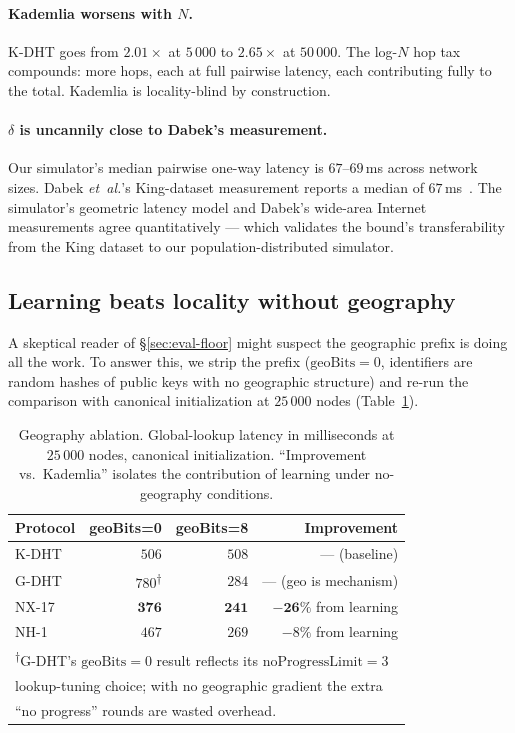 \documentclass[conference]{IEEEtran}
\newcommand{\nhone}{NH-1\xspace}
\newcommand{\GDHT}{G-DHT\xspace}
\newcommand{\NXseventeen}{NX-17\xspace}
\begin{document}
\paragraph{Kademlia worsens with $N$.}
K-DHT goes from $2.01\times$ at $5\,000$ to $2.65\times$ at $50\,000$.
The log-$N$ hop tax compounds: more hops, each at full pairwise
latency, each contributing fully to the total. Kademlia is locality-blind
by construction.

\paragraph{$\delta$ is uncannily close to Dabek's measurement.}
Our simulator's median pairwise one-way latency is $67$--$69$\,ms across
network sizes. Dabek \emph{et~al.}'s King-dataset measurement reports a
median of $67$\,ms~\cite{dabek2004designing}. The simulator's geometric
latency model and Dabek's wide-area Internet measurements agree
quantitatively --- which validates the bound's transferability from
the King dataset to our population-distributed simulator.

\subsection{Learning beats locality without geography}
\label{sec:eval-geo}

A skeptical reader of \S\ref{sec:eval-floor} might suspect the
geographic prefix is doing all the work. To answer this, we strip
the prefix ($\mathrm{geoBits} = 0$, identifiers are random hashes of
public keys with no geographic structure) and re-run the comparison
with canonical initialization at $25\,000$ nodes (Table~\ref{tab:geo}).

\begin{table}[t]
\centering
\caption{Geography ablation. Global-lookup latency in milliseconds at
$25\,000$ nodes, canonical initialization. ``Improvement vs.\ Kademlia''
isolates the contribution of learning under no-geography conditions.}
\label{tab:geo}
\small
\setlength{\tabcolsep}{4pt}
\begin{tabular}{@{}lrrr@{}}
\toprule
\textbf{Protocol} & \textbf{geoBits=0} & \textbf{geoBits=8} & \textbf{Improvement} \\
\midrule
K-DHT & $506$ & $508$ & --- (baseline) \\
\GDHT & $780$\textsuperscript{$\dagger$} & $284$ & --- (geo is mechanism) \\
\NXseventeen & $\mathbf{376}$ & $\mathbf{241}$ & $\mathbf{-26\%}$ from learning \\
\nhone & $467$ & $269$ & $-8\%$ from learning \\
\bottomrule
\multicolumn{4}{l}{\footnotesize\textsuperscript{$\dagger$}\GDHT's
$\mathrm{geoBits} = 0$ result reflects its $\mathrm{noProgressLimit} = 3$} \\
\multicolumn{4}{l}{\footnotesize lookup-tuning choice; with no geographic
gradient the extra} \\
\multicolumn{4}{l}{\footnotesize ``no progress'' rounds are wasted overhead.}
\end{tabular}
\end{table}
\end{document}
